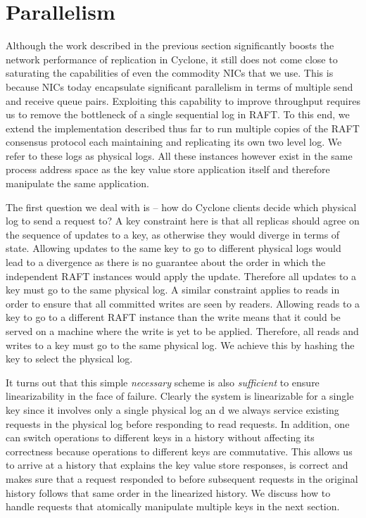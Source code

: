 \documentclass[pageno]{jpaper}
\begin{document}
\section{Parallelism}
\label{sec:parallelism}


Although the work described in the previous section significantly boosts the
network performance of replication in Cyclone, it still does not come close to
saturating the capabilities of even the commodity NICs that we use. This is
because NICs today encapsulate significant parallelism in terms of
multiple send and receive queue pairs. Exploiting this capability to improve
throughput requires us to remove the bottleneck of a single sequential log in
RAFT. To this end, we extend the implementation described thus far to run
multiple copies of the RAFT consensus protocol each maintaining and replicating
its own two level log. We refer to these logs as physical logs. All these
instances however exist in the same process address space as the key value store
application itself and therefore manipulate the same application.

The first question we deal with is -- how do Cyclone clients decide which
physical log to send a request to? A key constraint here is that all replicas
should agree on the sequence of updates to a key, as otherwise they would
diverge in terms of state. Allowing updates to the same key to go to different
physical logs would lead to a divergence as there is no guarantee about the
order in which the independent RAFT instances would apply the update. Therefore
all updates to a key must go to the same physical log. A similar constraint
applies to reads in order to ensure that all committed writes are seen by
readers. Allowing reads to a key to go to a different RAFT instance than the
write means that it could be served on a machine where the write is yet to be
applied. Therefore, all reads and writes to a key must go to the same physical
log. We achieve this by hashing the key to select the physical log.

It turns out that this simple \emph{necessary} scheme is also \emph{sufficient}
to ensure linearizability in the face of failure. Clearly the system is
linearizable for a single key since it involves only a single physical log an d
we always service existing requests in the physical log before responding to
read requests. In addition, one can switch operations to different keys in a
history without affecting its correctness because operations to different keys
are commutative. This allows us to arrive at a history that explains the key
value store responses, is correct and makes sure that a request responded to
before subsequent requests in the original history follows that same order in
the linearized history. We discuss how to handle requests that atomically
manipulate multiple keys in the next section.
\end{document}
